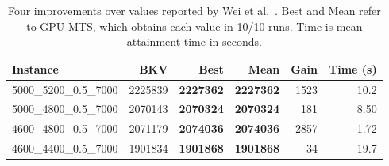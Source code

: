 \begin{table}[tbp]\centering\small
\caption{Four improvements over values reported by Wei et al.~\cite{Wei2026ANRMA}. Best and Mean refer to GPU-MTS, which obtains each value in 10/10 runs. Time is mean attainment time in seconds.}
\label{tab:reference-improvements}
\begin{tabular}{lrrrrr}
\toprule
Instance & BKV & Best & Mean & Gain & Time (s)\\
\midrule
5000\_5200\_0.5\_7000 & 2225839 & \textbf{2227362} & \textbf{2227362} & 1523 & 10.2\\
5000\_4800\_0.5\_7000 & 2070143 & \textbf{2070324} & \textbf{2070324} & 181 & 8.50\\
4600\_4800\_0.5\_7000 & 2071179 & \textbf{2074036} & \textbf{2074036} & 2857 & 1.72\\
4600\_4400\_0.5\_7000 & 1901834 & \textbf{1901868} & \textbf{1901868} & 34 & 19.7\\
\bottomrule\end{tabular}
\end{table}
